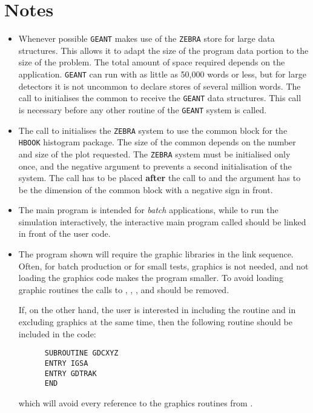 \section{Notes}
\begin{itemize}
\item Whenever possible {\tt GEANT} makes use of the {\tt ZEBRA} store
for large data structures. This allows it to adapt the size of the program
data portion
to the size of the problem. The total amount of space required depends
on the application. {\tt GEANT} can run with as little as 50,000 words
or less, but for large detectors it is not uncommon to 
declare stores of several million words. The call to 
initialises the common  to receive the {\tt GEANT}
data structures. This call is necessary before any other routine of
the {\tt GEANT} system is called.
\item The call to  initialises the {\tt ZEBRA} system
to use the  common block for the {\tt HBOOK} histogram
package. The size of the common depends on the number and size of the
plot requested. The {\tt ZEBRA} system must be initialised only once,
and the negative argument to  prevents a second
initialisation of the system.
The  call has to be placed {\bf after} the call
to  and the argument has to be the dimension of the 
 common block with a negative sign in front. 
\item
The main program is intended for {\it batch} applications,
while to run the simulation interactively, the interactive main program
called  should be linked in front of the user code.
\item The program shown will require the graphic libraries in the
link sequence. Often, for batch production or for
small tests, graphics is not needed, and not loading the graphics
code makes the program smaller. To avoid loading graphic routines
the calls to , , , 
and  should be removed. 

If, on the other hand, the user is interested in including the routine
 and in excluding graphics at the same time, then the
following routine should be included in the code:
\begin{verbatim}
      SUBROUTINE GDCXYZ
      ENTRY IGSA
      ENTRY GDTRAK
      END
\end{verbatim}

which will avoid every reference to the graphics routines from .


\end{itemize}
